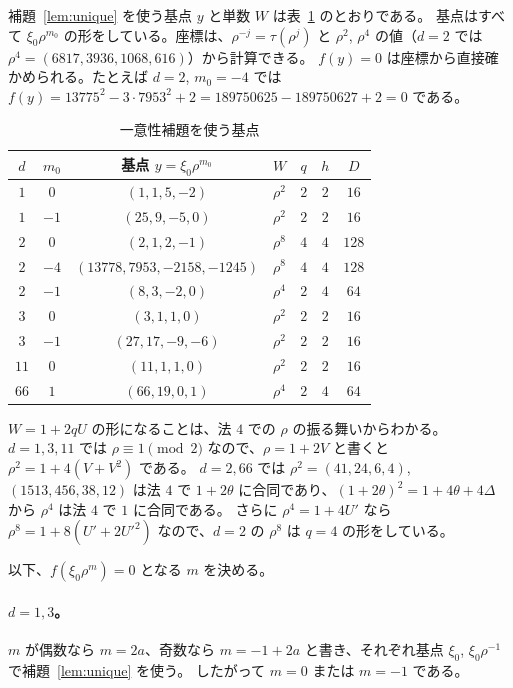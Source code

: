 \documentclass[a4paper,11pt]{ltjsarticle}
\theoremstyle{jplain}
\numberwithin{equation}{section}
\numberwithin{table}{section}
\begin{document}
補題~\ref{lem:unique} を使う基点 $y$ と単数 $W$ は表~\ref{tab:centres} のとおりである。
基点はすべて $\xi_0\rho^{m_0}$ の形をしている。座標は、$\rho^{-j}=\tau(\rho^j)$ と $\rho^2$, $\rho^4$ の値（$d=2$ では $\rho^4=(6817,3936,1068,616)$）から計算できる。
$f(y)=0$ は座標から直接確かめられる。たとえば $d=2$, $m_0=-4$ では $f(y)=13775^2-3\cdot7953^2+2=189750625-189750627+2=0$ である。

\begin{table}[htbp]
\centering
\caption{一意性補題を使う基点}\label{tab:centres}
\begin{tabular}{ccccccc}
\toprule
$d$ & $m_0$ & 基点 $y=\xi_0\rho^{m_0}$ & $W$ & $q$ & $h$ & $D$\\
\midrule
$1$ & $0$ & $(1,1,5,-2)$ & $\rho^2$ & $2$ & $2$ & $16$\\
$1$ & $-1$ & $(25,9,-5,0)$ & $\rho^2$ & $2$ & $2$ & $16$\\
$2$ & $0$ & $(2,1,2,-1)$ & $\rho^8$ & $4$ & $4$ & $128$\\
$2$ & $-4$ & $(13778,7953,-2158,-1245)$ & $\rho^8$ & $4$ & $4$ & $128$\\
$2$ & $-1$ & $(8,3,-2,0)$ & $\rho^4$ & $2$ & $4$ & $64$\\
$3$ & $0$ & $(3,1,1,0)$ & $\rho^2$ & $2$ & $2$ & $16$\\
$3$ & $-1$ & $(27,17,-9,-6)$ & $\rho^2$ & $2$ & $2$ & $16$\\
$11$ & $0$ & $(11,1,1,0)$ & $\rho^2$ & $2$ & $2$ & $16$\\
$66$ & $1$ & $(66,19,0,1)$ & $\rho^4$ & $2$ & $4$ & $64$\\
\bottomrule
\end{tabular}
\end{table}

$W=1+2qU$ の形になることは、法 $4$ での $\rho$ の振る舞いからわかる。
$d=1,3,11$ では $\rho\equiv1\pmod2$ なので、$\rho=1+2V$ と書くと $\rho^2=1+4(V+V^2)$ である。
$d=2,66$ では $\rho^2=(41,24,6,4)$, $(1513,456,38,12)$ は法 $4$ で $1+2\theta$ に合同であり、$(1+2\theta)^2=1+4\theta+4\Delta$ から $\rho^4$ は法 $4$ で $1$ に合同である。
さらに $\rho^4=1+4U'$ なら $\rho^8=1+8(U'+2U'^2)$ なので、$d=2$ の $\rho^8$ は $q=4$ の形をしている。

以下、$f(\xi_0\rho^m)=0$ となる $m$ を決める。

\paragraph{$d=1,3$。}
$m$ が偶数なら $m=2a$、奇数なら $m=-1+2a$ と書き、それぞれ基点 $\xi_0$, $\xi_0\rho^{-1}$ で補題~\ref{lem:unique} を使う。
したがって $m=0$ または $m=-1$ である。
\end{document}
